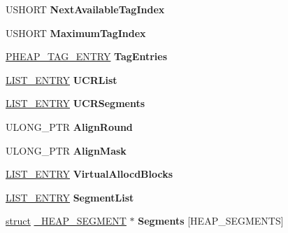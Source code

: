 \begin{DoxyCompactItemize}
U\+S\+H\+O\+RT {\bfseries Next\+Available\+Tag\+Index}
\item 
\mbox{\label{struct___h_e_a_p_a43237c23ec2adc863bdb7cbe87c32565}} 
U\+S\+H\+O\+RT {\bfseries Maximum\+Tag\+Index}
\item 
\mbox{\label{struct___h_e_a_p_ab389d7ac462b8a1d46b7ca864bf2e942}} 
\hyperlink{struct___h_e_a_p___t_a_g___e_n_t_r_y}{P\+H\+E\+A\+P\+\_\+\+T\+A\+G\+\_\+\+E\+N\+T\+RY} {\bfseries Tag\+Entries}
\item 
\mbox{\label{struct___h_e_a_p_ade4808411323f8517c5ede7df98bca30}} 
\hyperlink{struct___l_i_s_t___e_n_t_r_y}{L\+I\+S\+T\+\_\+\+E\+N\+T\+RY} {\bfseries U\+C\+R\+List}
\item 
\mbox{\label{struct___h_e_a_p_ac69088991bc4dde57d850d7afe10f0a1}} 
\hyperlink{struct___l_i_s_t___e_n_t_r_y}{L\+I\+S\+T\+\_\+\+E\+N\+T\+RY} {\bfseries U\+C\+R\+Segments}
\item 
\mbox{\label{struct___h_e_a_p_a6b932654c9cb53b68cb5cdd27960b2db}} 
U\+L\+O\+N\+G\+\_\+\+P\+TR {\bfseries Align\+Round}
\item 
\mbox{\label{struct___h_e_a_p_aa1f79414c1c7cfa2f0aa0d7916b0574b}} 
U\+L\+O\+N\+G\+\_\+\+P\+TR {\bfseries Align\+Mask}
\item 
\mbox{\label{struct___h_e_a_p_aa440de4840e3cfc541818c35cbba5218}} 
\hyperlink{struct___l_i_s_t___e_n_t_r_y}{L\+I\+S\+T\+\_\+\+E\+N\+T\+RY} {\bfseries Virtual\+Allocd\+Blocks}
\item 
\mbox{\label{struct___h_e_a_p_aafe672421b8a3370bb8366c242419acc}} 
\hyperlink{struct___l_i_s_t___e_n_t_r_y}{L\+I\+S\+T\+\_\+\+E\+N\+T\+RY} {\bfseries Segment\+List}
\item 
\mbox{\label{struct___h_e_a_p_af6775c8525914dc8400ef8c877913fec}} 
\hyperlink{interfacestruct}{struct} \hyperlink{struct___h_e_a_p___s_e_g_m_e_n_t}{\+\_\+\+H\+E\+A\+P\+\_\+\+S\+E\+G\+M\+E\+NT} $\ast$ {\bfseries Segments} \mbox{[}H\+E\+A\+P\+\_\+\+S\+E\+G\+M\+E\+N\+TS\mbox{]}
\item 
\mbox{\label{struct___h_e_a_p_ac07cea42a5f60d81bd63b95a75677057}} 

\end{DoxyCompactItemize}

